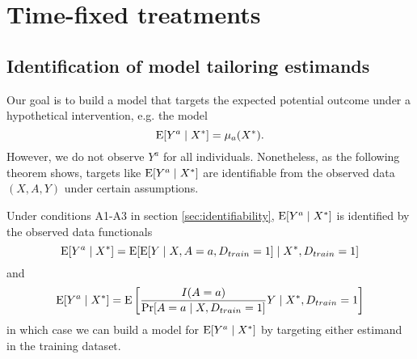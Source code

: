 
\section{Time-fixed treatments} \label{sec:appendixa}

    \subsection{Identification of model tailoring estimands}\label{sec:model_proof}
    Our goal is to build a model that targets the expected potential outcome under a hypothetical intervention, e.g. the  model 
    $$\operatorname{E}[Y^a \mid X^*] = \mu_{a}(X^*).$$
    However, we do not observe $Y^a$ for all individuals. Nonetheless, as the following theorem shows, targets like $\operatorname{E}[Y^a \mid X^*]$ are identifiable from the observed data $(X, A, Y)$ under certain assumptions. 
    
    \begin{theorem}
     Under conditions A1-A3 in section \ref{sec:identifiability}, $\operatorname{E}[Y^a \mid X^*]$ is identified by the observed data functionals
    \begin{equation}
        \operatorname{E}[Y^a \mid X^*] = \operatorname{E}[\operatorname{E}[Y \mid X, A = a, D_{train} = 1] \mid X^*, D_{train} = 1]
    \end{equation}
    and
    \begin{equation}
        \operatorname{E}[Y^a \mid X^*] = \operatorname{E}\left[\frac{I(A = a)}{\Pr[A = a \mid X, D_{train} = 1]} Y \mid X^*, D_{train} = 1\right]
    \end{equation}
    in which case we can build a model for $\operatorname{E}[Y^a \mid X^*]$ by targeting either estimand in the training dataset.
    \end{theorem}
    
